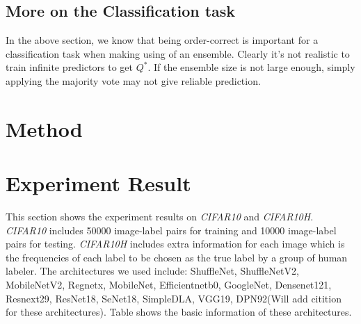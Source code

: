 \documentclass{article}
\begin{document}
\subsection{More on the Classification task}
In the above section, we know that being order-correct is important for a classification task when making using of an ensemble. Clearly it's not realistic to train infinite predictors to get $Q^*$. If the ensemble size is not large enough, simply applying the majority vote may not give reliable prediction.

\section{Method}

\section{Experiment Result}
This section shows the experiment results on \textit{CIFAR10}\cite{cifar10} and \textit{CIFAR10H}\cite{cifar10h}. \textit{CIFAR10} includes 50000 image-label pairs for training and 10000 image-label pairs for testing. \textit{CIFAR10H} includes extra information for each image which is the frequencies of each label to be chosen as the true label by a group of human labeler. The architectures we used include: ShuffleNet, ShuffleNetV2, MobileNetV2, Regnetx, MobileNet, Efficientnetb0, GoogleNet, Densenet121, Resnext29, ResNet18, SeNet18, SimpleDLA, VGG19, DPN92(Will add citition for these architectures). Table\cite{table:arc_basic} shows the basic information of these architectures.
\end{document}
